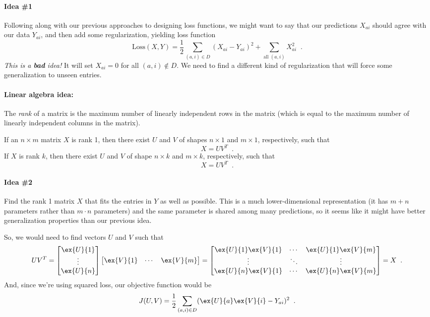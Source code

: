 \paragraph*{Idea \#1}
Following along with our previous approaches to designing loss
functions, we might want to say that our predictions $X_{ai}$ should
agree with our data $Y_{ai}$, and then add some regularization,
yielding loss function
\[\text{Loss}\text{}(X, Y) = \frac{1}{2} \sum_{(a,i) \in D}
(X_{ai}-Y_{ai})^2 + \sum_{\text{all } (a,i)}X_{ai}^2\;\;.\]
{\em This is a {\bf bad} idea!}  It will set $X_{ai} = 0$ for all $(a,
i) \not \in D$. 
We need to find a different kind of regularization that will force
some generalization to unseen entries.

\begin{examplebox}
\paragraph*{Linear algebra idea:}
The \emph{rank} of a matrix is the maximum number of linearly independent
rows in the matrix (which is equal to the maximum number of linearly
independent columns in the matrix). 

If an $n \times m$ matrix $X$ is rank 1, then there exist $U$ and $V$ of
shapes $n \times 1$ and $m \times 1$, respectively, such that
\[X = UV^T\;\;.\]
If $X$ is rank $k$, then there exist $U$ and $V$ of shape $n \times k$
and $m \times k$, respectively, such that
\[X = UV^T\;\;.\]
\end{examplebox}

\paragraph*{Idea \#2}
Find the rank 1 matrix $X$ that fits the entries in $Y$ as well as
possible.   This is a much lower-dimensional representation (it has $m
+ n$ parameters rather than $m \cdot n$ parameters) and the same
parameter is shared among many predictions, so it seems like it might
have better generalization properties than our previous idea.

So, we would need to find vectors $U$ and $V$ such that
\[
  UV^T
  = 
  \begin{bmatrix}
    \ex{U}{1} \\ \vdots \\ \ex{U}{n}
  \end{bmatrix}
  \begin{bmatrix}
    \ex{V}{1} & \cdots & \ex{V}{m}
  \end{bmatrix}
  =
  \begin{bmatrix}
    \ex{U}{1}\ex{V}{1} & \cdots & \ex{U}{1}\ex{V}{m} \\
    \vdots & \ddots & \vdots \\
    \ex{U}{n}\ex{V}{1} & \cdots & \ex{U}{n}\ex{V}{m} \\
  \end{bmatrix}
  =
  X \;\;.
\]
And, since we're using squared loss, our objective function would be
\[
  J(U,V) = \frac{1}{2}
  \sum_{(a,i)\in D}(\ex{U}{a}\ex{V}{i} - Y_{ai})^2 \;\;.
\]

